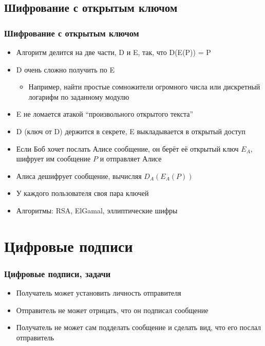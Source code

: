 \documentclass[xetex,mathserif,serif]{beamer}
\begin{document}
    \subsection{Шифрование с открытым ключом}

    \begin{frame}
        \frametitle{Шифрование с открытым ключом}
        \begin{itemize}
            \item Алгоритм делится на две части, D и E, так, что D(E(P)) = P
            \item D очень сложно получить по E
            \begin{itemize}
                \item Например, найти простые сомножители огромного числа или дискретный логарифм по заданному модулю
            \end{itemize}
            \item E не ломается атакой ``произвольного открытого текста''
            \item D (ключ от D) держится в секрете, E выкладывается в открытый доступ
            \item Если Боб хочет послать Алисе сообщение, он берёт её открытый ключ $E_A$, шифрует им сообщение $P$ и отправляет Алисе
            \item Алиса дешифрует сообщение, вычисляя $D_A(E_A(P))$
            \item У каждого пользователя своя пара ключей
            \item Алгоритмы: RSA, ElGamal, эллиптические шифры
        \end{itemize}
    \end{frame}

    \section{Цифровые подписи}

    \begin{frame}
        \frametitle{Цифровые подписи, задачи}
        \begin{itemize}
            \item Получатель может установить личность отправителя
            \item Отправитель не может отрицать, что он подписал сообщение
            \item Получатель не может сам подделать сообщение и сделать вид, что его послал отправитель
        \end{itemize}
    \end{frame}
\end{document}
